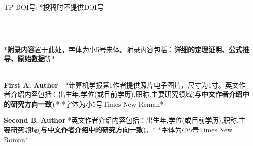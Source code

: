 \documentclass[10.5pt,compsoc,UTF8]{CjC}
\theoremstyle{mystyle}
\begin{document}
\vspace {5mm}

\par\noindent
{} TP\rm{\quad \quad \quad     }
{\heiti DOI号:\quad } *投稿时不提供DOI号

\vskip 5mm


\begin{center}
\\
\vspace {5mm}
\\
\vspace {1mm}


\end{center}



\begin{multicols}{1}






\end{multicols}

\begin{multicols}{1}

{\setlength\parindent{2em}
*\textbf{附录内容}置于此处，字体为小5号宋体。附录内容包括：\textbf{详细的定理证明、公式推导、原始数据}等*}\\\\

\end{multicols}


\begin{multicols}{1}
\begin{biography}
\noindent
\textbf{First A. Author}\ \ *计算机学报第1作者提供照片电子图片，尺寸为1寸。英文作者介绍内容包括：出生年,学位(或目前学历),职称,主要研究领域(\textbf{与中文作者介绍中的研究方向一致}).*
*字体为小5号Times New Roman*
\end{biography}

\begin{biography}
\noindent
\textbf{Second B. Author} *英文作者介绍内容包括：出生年,学位(或目前学历),职称,主要研究领域(\textbf{与中文作者介绍中的研究方向一致})。*
*字体为小5号Times New Roman*
\end{biography}
\end{multicols}
\end{document}
